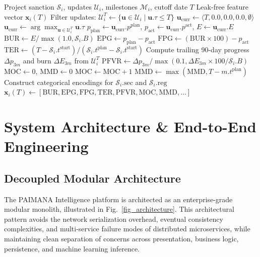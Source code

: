 \documentclass[conference]{IEEEtran}
\begin{document}
\begin{algorithm}[htbp]
\caption{Temporal Cutoff Feature Extraction Pipeline}
\label{alg_feature_extraction}
\begin{algorithmic}[1]
\REQUIRE Project sanction $\mathcal{S}_i$, updates $\mathcal{U}_i$, milestones $\mathcal{M}_i$, cutoff date $T$
\ENSURE Leak-free feature vector $\mathbf{x}_i(T)$
\STATE Filter updates: $\mathcal{U}_i^T \leftarrow \{ \mathbf{u} \in \mathcal{U}_i \mid \mathbf{u}.\tau \le T \}$
    \STATE $\mathbf{u}_{\text{curr}} \leftarrow \langle T, 0.0, 0.0, 0.0, \emptyset \rangle$
\ELSE
    \STATE $\mathbf{u}_{\text{curr}} \leftarrow \arg\max_{\mathbf{u} \in \mathcal{U}_i^T} \mathbf{u}.\tau$
\ENDIF
\STATE $p_{\text{plan}} \leftarrow \mathbf{u}_{\text{curr}}.p^{\text{plan}}$, $p_{\text{act}} \leftarrow \mathbf{u}_{\text{curr}}.p^{\text{act}}$, $E \leftarrow \mathbf{u}_{\text{curr}}.E$
\STATE $\text{BUR} \leftarrow E / \max(1.0, \mathcal{S}_i.B)$
\STATE $\text{EPG} \leftarrow p_{\text{plan}} - p_{\text{act}}$
\STATE $\text{FPG} \leftarrow (\text{BUR} \times 100) - p_{\text{act}}$
\STATE $\text{TER} \leftarrow (T - \mathcal{S}_i.t^{\text{start}}) / (\mathcal{S}_i.t^{\text{plan}} - \mathcal{S}_i.t^{\text{start}})$
\STATE Compute trailing 90-day progress $\Delta p_{3m}$ and burn $\Delta E_{3m}$ from $\mathcal{U}_i^T$
\STATE $\text{PFVR} \leftarrow \Delta p_{3m} / \max(0.1, \Delta E_{3m} \times 100 / \mathcal{S}_i.B)$
\STATE $\text{MOC} \leftarrow 0$, $\text{MMD} \leftarrow 0$
        \STATE $\text{MOC} \leftarrow \text{MOC} + 1$
        \STATE $\text{MMD} \leftarrow \max(\text{MMD}, T - m.t^{\text{plan}})$
    \ENDIF
\ENDFOR
\STATE Construct categorical encodings for $\mathcal{S}_i.\text{sec}$ and $\mathcal{S}_i.\text{reg}$
\RETURN $\mathbf{x}_i(T) \leftarrow [\text{BUR}, \text{EPG}, \text{FPG}, \text{TER}, \text{PFVR}, \text{MOC}, \text{MMD}, \dots]$
\end{algorithmic}
\end{algorithm}

\section{System Architecture \& End-to-End Engineering}

\subsection{Decoupled Modular Architecture}
The PAIMANA Intelligence platform is architected as an enterprise-grade modular monolith, illustrated in Fig.~\ref{fig_architecture}. This architectural pattern avoids the network serialization overhead, eventual consistency complexities, and multi-service failure modes of distributed microservices, while maintaining clean separation of concerns across presentation, business logic, persistence, and machine learning inference.
\end{document}
